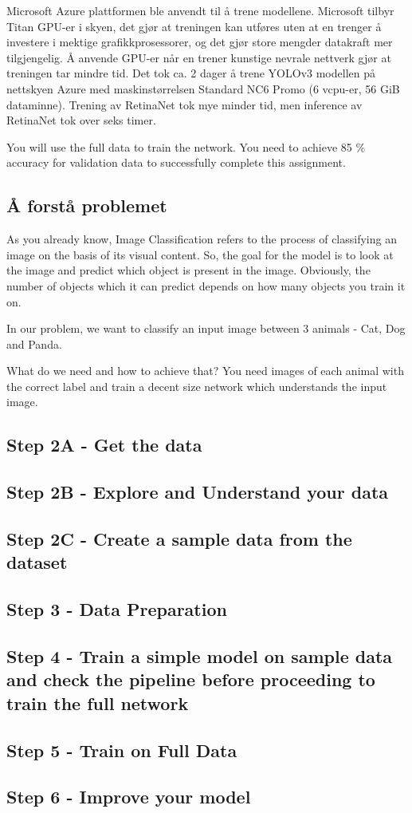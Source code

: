 Microsoft Azure plattformen ble anvendt til å trene modellene. Microsoft tilbyr Titan GPU-er i skyen, det gjør at treningen kan utføres uten at en trenger å investere i mektige grafikkprosessorer, og det gjør store mengder datakraft mer tilgjengelig. Å anvende GPU-er når en trener kunstige nevrale nettverk gjør at treningen tar mindre tid. Det tok ca. 2 dager å trene YOLOv3 modellen på nettskyen Azure med maskinstørrelsen Standard NC6 Promo (6 vcpu-er, 56 GiB dataminne). Trening av RetinaNet tok mye minder tid, men inference av RetinaNet tok over seks timer.

You will use the full data to train the network. You need to achieve 85 \% accuracy for validation data to successfully complete this assignment.

\subsection{Å forstå problemet}

As you already know, Image Classification refers to the process of classifying an image on the basis of its visual content. So, the goal for the model is to look at the image and predict which object is present in the image. Obviously, the number of objects which it can predict depends on how many objects you train it on.

In our problem, we want to classify an input image between 3 animals - Cat, Dog and Panda.

What do we need and how to achieve that? 
You need images of each animal with the correct label and train a decent size network which understands the input image.

\subsection{Step 2A - Get the data}
\subsection{Step 2B - Explore and Understand your data}
\subsection{Step 2C - Create a sample data from the dataset}
\subsection{Step 3 - Data Preparation}
\subsection{Step 4 - Train a simple model on sample data and check the pipeline before proceeding to train the full network}
\subsection{Step 5 - Train on Full Data}
\subsection{Step 6 - Improve your model}

